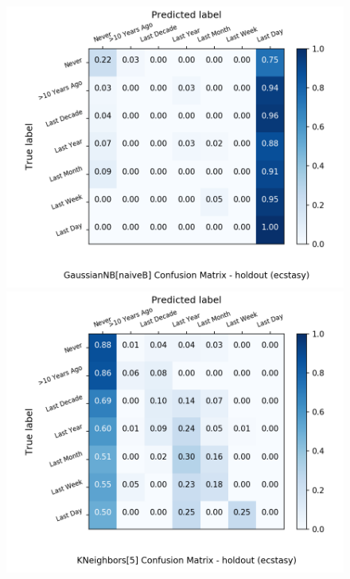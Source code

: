 \begin{figure}[H]
\begin{minipage}[b]{0.32\textwidth}
		\includegraphics[width=1.1\textwidth]{Plots/ecstasy_GaussianNB_naiveB_balance_False_holdout.png}
	\end{minipage}
	\begin{minipage}[b]{0.32\textwidth}
		\includegraphics[width=1.1\textwidth]{Plots/ecstasy_KNeighbors_5_balance_False_holdout.png}
  \end{minipage}
	\begin{minipage}[b]{0.32\textwidth}

\end{minipage}
\end{figure}
